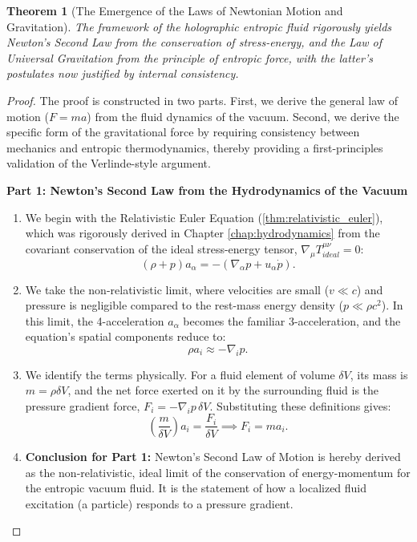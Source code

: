 \documentclass[11pt, letterpaper]{report}
\theoremstyle{plain} %
\newtheorem{theorem}{Theorem}[chapter]
\theoremstyle{definition} %
\theoremstyle{remark} %
\begin{document}
\begin{theorem}[The Emergence of the Laws of Newtonian Motion and Gravitation]
\label{thm:derive_newton_full}
The framework of the holographic entropic fluid rigorously yields Newton's Second Law from the conservation of stress-energy, and the Law of Universal Gravitation from the principle of entropic force, with the latter's postulates now justified by internal consistency.
\end{theorem}
\begin{proof}
The proof is constructed in two parts. First, we derive the general law of motion ($F=ma$) from the fluid dynamics of the vacuum. Second, we derive the specific form of the gravitational force by requiring consistency between mechanics and entropic thermodynamics, thereby providing a first-principles validation of the Verlinde-style argument.

\textbf{Part 1: Newton's Second Law from the Hydrodynamics of the Vacuum}
\begin{enumerate}
    \item We begin with the Relativistic Euler Equation (\cref{thm:relativistic_euler}), which was rigorously derived in Chapter \ref{chap:hydrodynamics} from the covariant conservation of the ideal stress-energy tensor, $\nabla_\mu T^{\mu\nu}_{ideal} = 0$:
    \begin{equation}
        (\rho+p)a_\alpha = -(\nabla_\alpha p + u_\alpha \dot{p}).
    \end{equation}
    \item We take the non-relativistic limit, where velocities are small ($v \ll c$) and pressure is negligible compared to the rest-mass energy density ($p \ll \rho c^2$). In this limit, the 4-acceleration $a_\alpha$ becomes the familiar 3-acceleration, and the equation's spatial components reduce to:
    \begin{equation}
        \rho a_i \approx -\nabla_i p.
    \end{equation}
    \item We identify the terms physically. For a fluid element of volume $\delta V$, its mass is $m = \rho \delta V$, and the net force exerted on it by the surrounding fluid is the pressure gradient force, $F_i = -\nabla_i p \, \delta V$. Substituting these definitions gives:
    $$ \left(\frac{m}{\delta V}\right) a_i = \frac{F_i}{\delta V} \implies F_i = m a_i. $$
    \item \textbf{Conclusion for Part 1:} Newton's Second Law of Motion is hereby derived as the non-relativistic, ideal limit of the conservation of energy-momentum for the entropic vacuum fluid. It is the statement of how a localized fluid excitation (a particle) responds to a pressure gradient.
\end{enumerate}


\end{proof}
\end{document}
